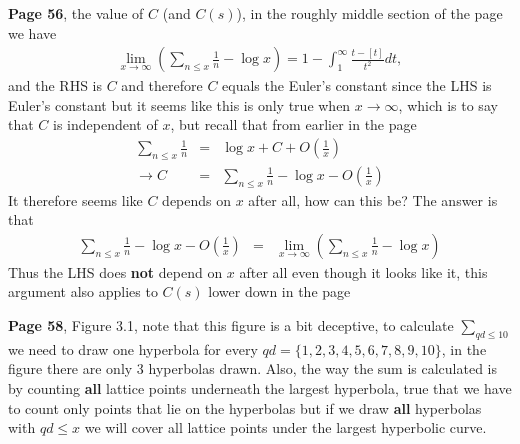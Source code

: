 \documentclass[aps,preprint,preprintnumbers,nofootinbib,showpacs,prd]{revtex4-1}
\newcommand{\nbea}{\begin{eqnarray*}}
\newcommand{\neea}{\end{eqnarray*}}
\begin{document}
{\bf Page 56}, the value of $C$ (and $C(s)$), in the roughly middle section of the page we have
%
\nbea
\lim_{x\to\infty}\left ( \sum_{n \le x} \frac{1}{n} - \log x\right) = 1 - \int_1^\infty \frac{t - [t]}{t^2} dt,
\neea
%
and the RHS is $C$ and therefore $C$ equals the Euler's constant since the LHS is Euler's constant but it seems like this is only true when $x \to \infty$, which is to say that $C$ is independent of $x$, but recall that from earlier in the page
%
\nbea
\sum_{n\le x} \frac{1}{n} & = & \log x + C + O\left ( \frac{1}{x}\right ) \\
\to C & = & \sum_{n\le x} \frac{1}{n} - \log x - O\left ( \frac{1}{x}\right ) 
\neea
%
It therefore seems like $C$ depends on $x$ after all, how can this be? The answer is that
%
\nbea
\sum_{n\le x} \frac{1}{n} - \log x - O\left ( \frac{1}{x}\right ) & = & \lim_{x\to\infty}\left ( \sum_{n \le x} \frac{1}{n} - \log x\right)
\neea
%
Thus the LHS does {\bf not} depend on $x$ after all even though it looks like it, this argument also applies to $C(s)$ lower down in the page

{\bf Page 58}, Figure 3.1, note that this figure is a bit deceptive, to calculate $\sum_{qd \le 10}$ we need to draw one hyperbola for every $qd = \{1,2,3,4,5,6,7,8,9,10\}$, in the figure there are only 3 hyperbolas drawn. Also, the way the sum is calculated is by counting {\bf all} lattice points underneath the largest hyperbola, true that we have to count only points that lie on the hyperbolas but if we draw {\bf all} hyperbolas with $qd \le x$ we will cover all lattice points under the largest hyperbolic curve.
\end{document}
